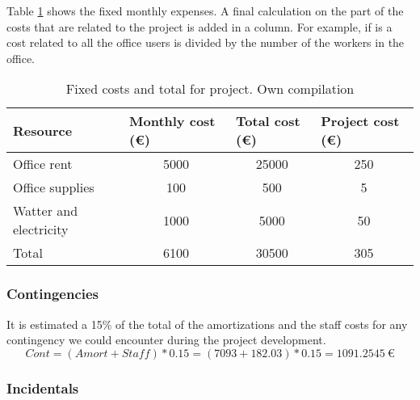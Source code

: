 Table \ref{tab:fix} shows the fixed monthly expenses. A final calculation on the part of the costs that are related to the project is added in a column. For example, if is a cost related to all the office users is divided by the number of the workers in the office.
\begin{table}[htbp!]
\centering
\begin{tabular}{|l|c|c|c|}
\hline
Resource               & \multicolumn{1}{l|}{Monthly cost (\euro)} & \multicolumn{1}{l|}{Total cost (\euro)} & \multicolumn{1}{l|}{Project cost (\euro)} \\ \hline
Office rent            & 5000                              & 25000                           & 250                               \\ \hline
Office supplies        & 100                               & 500                             & 5                                 \\ \hline
Watter and electricity & 1000                              & 5000                            & 50                                \\ \hline
Total                  & 6100                              & 30500                           & 305                               \\ \hline
\end{tabular}
\caption[Fixed costs and total for project.]{Fixed costs and total for project. Own compilation}
\label{tab:fix}
\end{table}

\subsubsection{Contingencies}

It is estimated a 15\% of the total of the amortizations and the staff costs for any contingency we could encounter during the project development.
\begin{equation*}
  Cont=(Amort+Staff)*0.15=(7093+182.03)*0.15=1091.2545\ \euro
\end{equation*}

\subsubsection{Incidentals}

